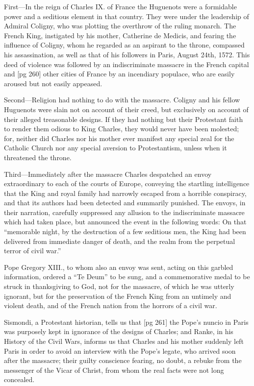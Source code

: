 First—In the reign of Charles IX. of France
the Huguenots were a formidable power and a
seditious element in that country. They were
under the leadership of Admiral Coligny, who was
plotting the overthrow of the ruling monarch.
The French King, instigated by his mother, Catherine
de Medicis, and fearing the influence of
Coligny, whom he regarded as an aspirant to the
throne, compassed his assassination, as well as
that of his followers in Paris, August 24th, 1572.
This deed of violence was followed by an indiscriminate
massacre in the French capital and
[pg 260]
other cities of France by an incendiary populace,
who are easily aroused but not easily appeased.

Second—Religion had nothing to do with the
massacre. Coligny and his fellow Huguenots
were slain not on account of their creed, but exclusively
on account of their alleged treasonable
designs. If they had nothing but their Protestant
faith to render them odious to King Charles, they
would never have been molested; for, neither did
Charles nor his mother ever manifest any special
zeal for the Catholic Church nor any special aversion
to Protestantism, unless when it threatened
the throne.

Third—Immediately after the massacre Charles
despatched an envoy extraordinary to each of the
courts of Europe, conveying the startling intelligence
that the King and royal family had narrowly
escaped from a horrible conspiracy, and
that its authors had been detected and summarily
punished. The envoys, in their narration, carefully
suppressed any allusion to the indiscriminate
massacre which had taken place, but announced
the event in the following words: On
that “memorable night, by the destruction of a
few seditious men, the King had been delivered
from immediate danger of death, and the realm
from the perpetual terror of civil war.”

Pope Gregory XIII., to whom also an envoy
was sent, acting on this garbled information, ordered
a “Te Deum” to be sung, and a commemorative
medal to be struck in thanksgiving to God,
not for the massacre, of which he was utterly
ignorant, but for the preservation of the French
King from an untimely and violent death, and of
the French nation from the horrors of a civil
war.

Sismondi, a Protestant historian, tells us that
[pg 261]
the Pope's nuncio in Paris was purposely kept in
ignorance of the designs of Charles; and Ranke,
in his History of the Civil Wars, informs us that
Charles and his mother suddenly left Paris in
order to avoid an interview with the Pope's legate,
who arrived soon after the massacre; their guilty
conscience fearing, no doubt, a rebuke from the
messenger of the Vicar of Christ, from whom
the real facts were not long concealed.

